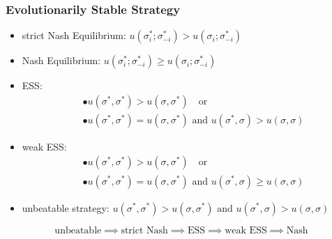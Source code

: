 \documentclass[UTF8,11pt,colorlinks,compress,openany]{beamer}%
\begin{document}
\begin{frame}\frametitle{Evolutionarily Stable Strategy}
\begin{itemize}
	\item strict Nash Equilibrium: $u(\sigma_i^*;\sigma_{-i}^*)>u(\sigma_i;\sigma_{-i}^*)$
	\item Nash Equilibrium: $u(\sigma_i^*;\sigma_{-i}^*)\geq u(\sigma_i;\sigma_{-i}^*)$
	\item ESS:
	\begin{align*}
	&\bullet u\left(\sigma^*,\sigma^*\right)>u\left(\sigma,\sigma^*\right)\quad\mbox{or}\\
	&\bullet u\left(\sigma^*,\sigma^*\right)=u\left(\sigma,\sigma^*\right)\mbox{ and } u\left(\sigma^*,\sigma\right)>u\left(\sigma,\sigma\right)
	\end{align*}
	\item weak ESS:
	\begin{align*}
	&\bullet u\left(\sigma^*,\sigma^*\right)>u\left(\sigma,\sigma^*\right)\quad\mbox{or}\\
	&\bullet u\left(\sigma^*,\sigma^*\right)=u\left(\sigma,\sigma^*\right)\mbox{ and } u\left(\sigma^*,\sigma\right)\geq u\left(\sigma,\sigma\right)
	\end{align*}
	\item unbeatable strategy:
	$u\left(\sigma^*,\sigma^*\right)>u\left(\sigma,\sigma^*\right)\mbox{ and } u\left(\sigma^*,\sigma\right)>u\left(\sigma,\sigma\right)$
\end{itemize}
\[\mbox{unbeatable}\implies\mbox{strict Nash}\implies\mbox{ESS}\implies\mbox{weak ESS}\implies\mbox{Nash}\]
\end{frame}
\end{document}
